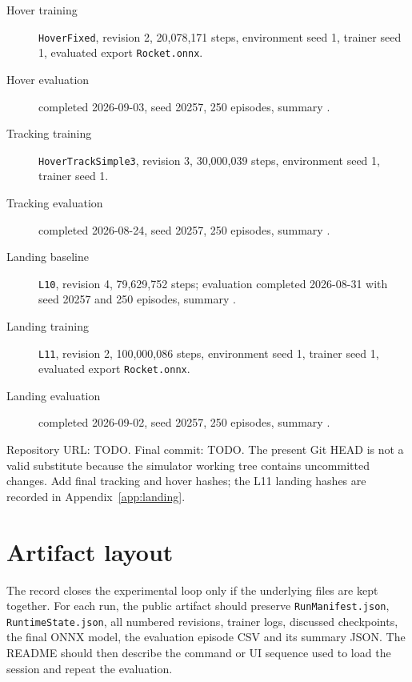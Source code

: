 \begin{description}
  \item[Hover training] \texttt{HoverFixed}, revision 2, 20,078,171 steps,
  environment seed 1, trainer seed 1, evaluated export \texttt{Rocket.onnx}.
  \item[Hover evaluation] completed 2026-09-03, seed 20257, 250 episodes,
  summary .
  \item[Tracking training] \texttt{HoverTrackSimple3}, revision 3, 30,000,039 steps,
  environment seed 1, trainer seed 1.
  \item[Tracking evaluation] completed 2026-08-24, seed 20257, 250 episodes,
  summary .
  \item[Landing baseline] \texttt{L10}, revision 4, 79,629,752 steps; evaluation completed
  2026-08-31 with seed 20257 and 250 episodes,
  summary .
  \item[Landing training] \texttt{L11}, revision 2, 100,000,086 steps, environment seed 1,
  trainer seed 1, evaluated export \texttt{Rocket.onnx}.
  \item[Landing evaluation] completed 2026-09-02, seed 20257, 250 episodes,
  summary .
\end{description}

\begin{thesistodo}
Repository URL: TODO. Final commit: TODO. The present Git HEAD is not a valid substitute because
the simulator working tree contains uncommitted changes. Add final tracking and hover hashes;
the L11 landing hashes are recorded in Appendix~\ref{app:landing}.
\end{thesistodo}

\section{Artifact layout}

The record closes the experimental loop only if the underlying files are kept together. For each
run, the public artifact should preserve \texttt{RunManifest.json}, \texttt{RuntimeState.json},
all numbered revisions, trainer logs, discussed checkpoints, the final ONNX model, the evaluation
episode CSV and its summary JSON. The README should then describe the command or UI sequence used
to load the session and repeat the evaluation.
